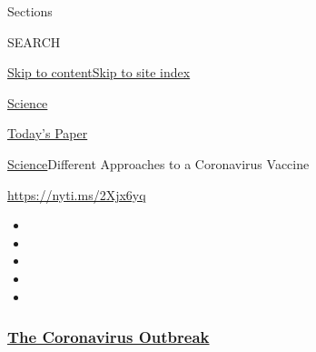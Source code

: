 Sections

SEARCH

\protect\hyperlink{site-content}{Skip to
content}\protect\hyperlink{site-index}{Skip to site index}

\href{https://www.nytimes3xbfgragh.onion/section/science}{Science}

\href{https://myaccount.nytimes3xbfgragh.onion/auth/login?response_type=cookie\&client_id=vi}{}

\href{https://www.nytimes3xbfgragh.onion/section/todayspaper}{Today's
Paper}

\href{/section/science}{Science}\textbar{}Different Approaches to a
Coronavirus Vaccine

\url{https://nyti.ms/2Xjx6yq}

\begin{itemize}
\item
\item
\item
\item
\item
\end{itemize}

\hypertarget{the-coronavirus-outbreak}{%
\subsubsection{\texorpdfstring{\href{https://www.nytimes3xbfgragh.onion/news-event/coronavirus?name=styln-coronavirus-national\&region=TOP_BANNER\&block=storyline_menu_recirc\&action=click\&pgtype=Interactive\&impression_id=47986300-f2ab-11ea-83ce-15100f254d71\&variant=undefined}{The
Coronavirus
Outbreak}}{The Coronavirus Outbreak}}\label{the-coronavirus-outbreak}}

